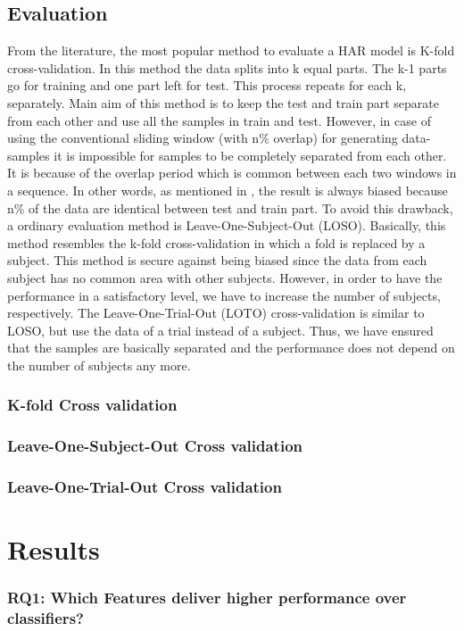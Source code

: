 \documentclass[journal,article,submit,moreauthors,pdftex]{Definitions/mdpi}
\begin{document}
\subsection{Evaluation}
From the literature, the most popular method to evaluate a HAR model is K-fold cross-validation. In this method the data splits into k equal parts. The k-1 parts go for training and one part left for test. This process repeats for each k, separately. Main aim of this method is to keep the test and train part separate from each other and use all the samples in train and test. However, in case of using the conventional sliding window (with n\% overlap) for generating data-samples it is impossible for samples to be completely separated from each other. It is because of the overlap period which is common between each two windows in a sequence. In other words, as mentioned in \cite{jordao2018human}, the result is always biased because n\% of the data are identical between test and train part. To avoid this drawback, a ordinary evaluation method is Leave-One-Subject-Out (LOSO). Basically, this method resembles the k-fold cross-validation in which a fold is replaced by a subject. This method is secure against being biased since the data from each subject has no common area with other subjects. However, in order to have the performance in a satisfactory level, we have to increase the number of subjects, respectively. The Leave-One-Trial-Out (LOTO) cross-validation\cite{jordao2018human} is similar to LOSO, but use the data of a trial instead of a subject. Thus, we have ensured that the samples are basically separated and the performance does not depend on the number of subjects any more.
\subsubsection{K-fold Cross validation}

\subsubsection{Leave-One-Subject-Out Cross validation}
\subsubsection{Leave-One-Trial-Out Cross validation}
\section{Results}

\subsubsection{RQ1: Which Features deliver higher performance over classifiers?}
\end{document}
